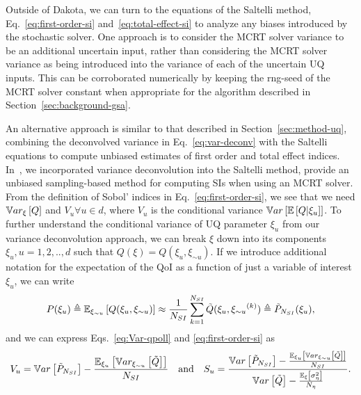 Outside of Dakota, we can turn to the equations of the Saltelli method, Eq.~\eqref{eq:first-order-si} and~\eqref{eq:total-effect-si} to analyze any biases introduced by the stochastic solver. One approach is to consider the MCRT solver variance to be an additional uncertain input, rather than considering the MCRT solver variance as being introduced into the variance of each of the uncertain UQ inputs. This can be corroborated numerically by keeping the rng-seed of the MCRT solver constant when appropriate for the algorithm described in Section~\ref{sec:background-gsa}. 

An alternative approach is similar to that described in Section~\ref{sec:method-uq}, combining the deconvolved variance in Eq.~\eqref{eq:var-deconv} with the Saltelli equations to compute unbiased estimates of first order and total effect indices. In~\cite{OlsonANSWinter}, we incorporated variance deconvolution into the Saltelli method, provide an unbiased sampling-based method for computing SIs when using an MCRT solver. From the definition of Sobol' indices in Eq.~\ref{eq:first-order-si}, we see that we need $\mathbb{V}ar_\xi\left[Q\right]$ and  $V_u \forall u \in d$, where $V_u$ is the conditional variance $\mathbb{V}ar\left[ \mathbb{E}\left[ Q | \xi_u \right] \right]$. To further understand the conditional variance of UQ parameter $\xi_u$ from our variance deconvolution approach, we can break $\xi$ down into its components $\xi_u, u=1,2,..,d$ such that $Q\left(\xi\right) = Q\left( \xi_u, \xi_{\sim u} \right)$. 
If we introduce additional notation for the expectation of the QoI as a function of just a variable of interest $\xi_u$, we can write
\begin{equation}
 P(\xi_u) \triangleq \mathbb{E}_{{\xi_{\sim u}}} \left[ Q({\xi_u},{\xi_{\sim u}}) \right] \approx \frac{1}{{N_{SI}}} \sum_{k=1}^{{N_{SI}}} \tilde{Q}( {\xi_u}, {\xi_{\sim u}}^{(k)} ) \triangleq \tilde{P}_{N_{SI}}({\xi_u}),
\end{equation}
and we can express Eqs.~\eqref{eq:Var-qpoll} and \eqref{eq:first-order-si} as 
\begin{equation}
 V_u %
     = \Var{\Ppoll} - \frac{\EEu{ \Vnu{\Qpoll} }}{\Nsi} \quad \mathrm{and} \quad 
% 
 S_u %
     = \frac{\Var{\Ppoll} - \frac{\EEu{ \Vnu{\Qpoll} }}{\Nsi}}{\Var{\Qpoll} - \frac{\EExi{ \SigSqeta }}{\Neta}} .
\end{equation}

